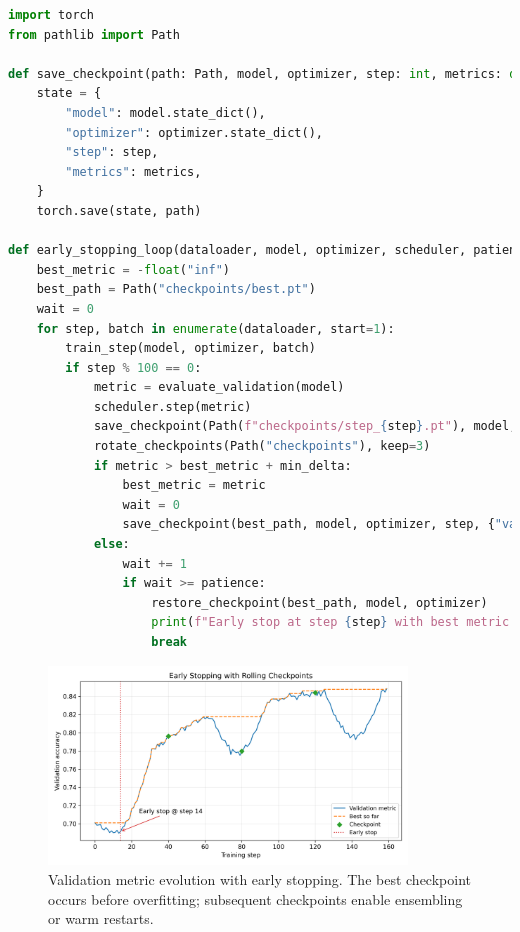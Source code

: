 \documentclass{article}
\begin{document}
\begin{lstlisting}[language=Python, caption={Early stopping with checkpoint rotation using PyTorch.}]
import torch
from pathlib import Path

def save_checkpoint(path: Path, model, optimizer, step: int, metrics: dict):
    state = {
        "model": model.state_dict(),
        "optimizer": optimizer.state_dict(),
        "step": step,
        "metrics": metrics,
    }
    torch.save(state, path)

def early_stopping_loop(dataloader, model, optimizer, scheduler, patience=10, min_delta=1e-4):
    best_metric = -float("inf")
    best_path = Path("checkpoints/best.pt")
    wait = 0
    for step, batch in enumerate(dataloader, start=1):
        train_step(model, optimizer, batch)
        if step % 100 == 0:
            metric = evaluate_validation(model)
            scheduler.step(metric)
            save_checkpoint(Path(f"checkpoints/step_{step}.pt"), model, optimizer, step, {"val": metric})
            rotate_checkpoints(Path("checkpoints"), keep=3)
            if metric > best_metric + min_delta:
                best_metric = metric
                wait = 0
                save_checkpoint(best_path, model, optimizer, step, {"val": metric})
            else:
                wait += 1
                if wait >= patience:
                    restore_checkpoint(best_path, model, optimizer)
                    print(f"Early stop at step {step} with best metric {best_metric:.4f}")
                    break
\end{lstlisting}

\begin{figure}[H]
  \centering
  \includegraphics[width=0.85\textwidth]{early_stopping_checkpoint.png}
  \caption{Validation metric evolution with early stopping. The best checkpoint occurs before overfitting; subsequent checkpoints enable ensembling or warm restarts.}
  \label{fig:early_stopping_checkpoint}
\end{figure}
\FloatBarrier
\end{document}
